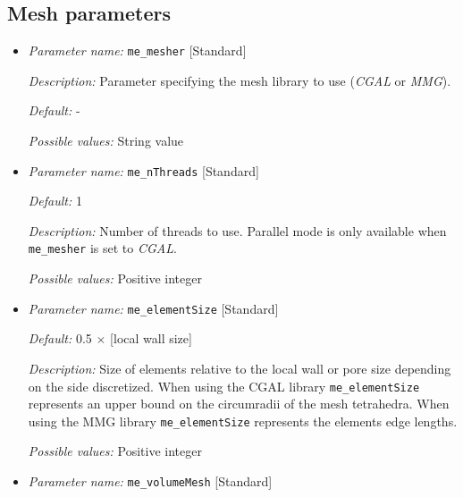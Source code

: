 \subsection{Mesh parameters} \label{parameters:mesh}
\begin{itemize}[itemsep=0.8em, parsep=0.3em]
	\item {\it Parameter name:} {\tt me\_mesher} \hfill [Standard]
	\label{parameters:me_mesher}
	
	
	{\it Description:} Parameter specifying the mesh library to use ({\it CGAL} or {\it MMG}).
	
	{\it Default:} -
	
	{\it Possible values:} String value
	
	\item {\it Parameter name:} {\tt me\_nThreads} \hfill [Standard]
	\label{parameters:me_nThreads}
	
	
	{\it Default:} 1
	
	{\it Description:} Number of threads to use. Parallel mode is only available when {\tt me\_mesher} is set to {\it CGAL}.
	
	{\it Possible values:} Positive integer

	\item {\it Parameter name:} {\tt me\_elementSize} \hfill [Standard]
	\label{parameters:me_elementSize}
	
	
	{\it Default:} 0.5 $\times$ [local wall size]
	
	{\it Description:} Size of elements relative to the local wall or pore size depending on the side discretized. When using the CGAL library {\tt me\_elementSize} represents an upper bound on the circumradii of the mesh tetrahedra. When using the MMG library {\tt me\_elementSize} represents the elements edge lengths.
	
	{\it Possible values:} Positive integer
	
	\item {\it Parameter name:} {\tt me\_volumeMesh} \hfill [Standard]
	\label{parameters:me_volumeMesh}
	

\end{itemize}
